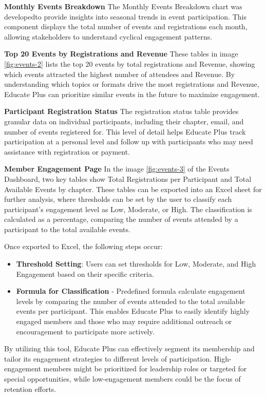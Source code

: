 \documentclass[11pt,a4paper,]{article}
\begin{document}
\textbf{Monthly Events Breakdown}
The Monthly Events Breakdown chart was developedto provide insights into seasonal trends in event participation. This component displays the total number of events and registrations each month, allowing stakeholders to understand cyclical engagement patterns.

\textbf{Top 20 Events by Registrations and Revenue}
These tables in image \ref{fig:events-2} lists the top 20 events by total registrations and Revenue, showing which events attracted the highest number of attendees and Revenue. By understanding which topics or formats drive the most registrations and Revenue, Educate Plus can prioritize similar events in the future to maximize engagement.

\textbf{Participant Registration Status}
The registration status table provides granular data on individual participants, including their chapter, email, and number of events registered for. This level of detail helps Educate Plus track participation at a personal level and follow up with participants who may need assistance with registration or payment.

\textbf{Member Engagement Page}
In the image \ref{fig:events-3} of the Events Dashboard, two key tables show Total Registrations per Participant and Total Available Events by chapter. These tables can be exported into an Excel sheet for further analysis, where thresholds can be set by the user to classify each participant's engagement level as Low, Moderate, or High. The classification is calculated as a percentage, comparing the number of events attended by a participant to the total available events.

Once exported to Excel, the following steps occur:

\begin{itemize}
\item
  \textbf{Threshold Setting}: Users can set thresholds for Low, Moderate, and High Engagement based on their specific criteria.
\item
  \textbf{Formula for Classification} - Predefined formula calculate engagement levels by comparing the number of events attended to the total available events per participant. This enables Educate Plus to easily identify highly engaged members and those who may require additional outreach or encouragement to participate more actively.
\end{itemize}

By utilizing this tool, Educate Plus can effectively segment its membership and tailor its engagement strategies to different levels of participation. High-engagement members might be prioritized for leadership roles or targeted for special opportunities, while low-engagement members could be the focus of retention efforts.
\end{document}
